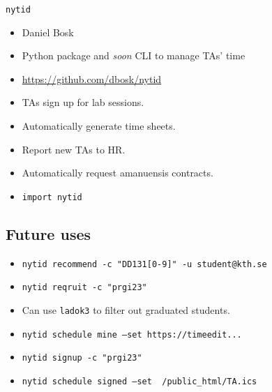 \begin{frame}[fragile]
  \begin{block}{\texttt{nytid}}
    \begin{itemize}
      \item Daniel Bosk
      \item Python package and \emph{soon} CLI to manage TAs' time
      \item \url{https://github.com/dbosk/nytid}
    \end{itemize}
  \end{block}

  \begin{example}
    \begin{itemize}
      \item TAs sign up for lab sessions.
      \item Automatically generate time sheets.
      \item Report new TAs to HR.
      \item Automatically request amanuensis contracts.

        \pause

      \item \texttt{import nytid}
    \end{itemize}
  \end{example}
\end{frame}

\subsection{Future uses}

\begin{frame}[fragile]
  \begin{example}[TA pool]
    \begin{itemize}
      \item \texttt{nytid recommend -c "DD131[0-9]" -u student@kth.se}
      \item \texttt{nytid reqruit -c "prgi23"}
      \item Can use \texttt{ladok3} to filter out graduated students.
    \end{itemize}
  \end{example}
  
  \pause

  \begin{example}[TA sign up]
    \begin{itemize}
      \item \texttt{nytid schedule mine --set  https://timeedit...}
      \item \texttt{nytid signup -c "prgi23"}
      \item \texttt{nytid schedule signed --set ~/public_html/TA.ics}
    \end{itemize}
  \end{example}
\end{frame}

